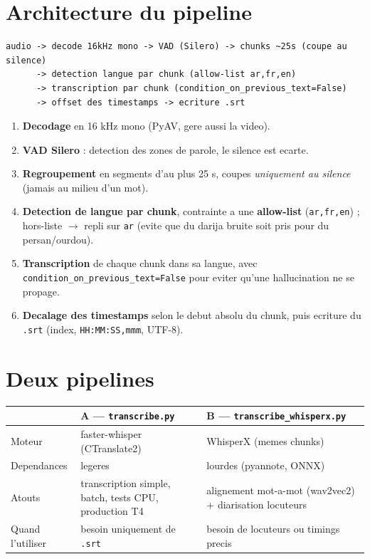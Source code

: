 \documentclass[11pt, a4paper]{article}
\begin{document}
\section{Architecture du pipeline}

\begin{lstlisting}
audio -> decode 16kHz mono -> VAD (Silero) -> chunks ~25s (coupe au silence)
      -> detection langue par chunk (allow-list ar,fr,en)
      -> transcription par chunk (condition_on_previous_text=False)
      -> offset des timestamps -> ecriture .srt
\end{lstlisting}

\begin{enumerate}
  \item \textbf{Decodage} en 16 kHz mono (PyAV, gere aussi la video).
  \item \textbf{VAD Silero} : detection des zones de parole, le silence est ecarte.
  \item \textbf{Regroupement} en segments d'au plus 25 s, coupes \emph{uniquement au silence} (jamais au milieu d'un mot).
  \item \textbf{Detection de langue par chunk}, contrainte a une \textbf{allow-list} (\texttt{ar,fr,en}) ; hors-liste $\rightarrow$ repli sur \texttt{ar} (evite que du darija bruite soit pris pour du persan/ourdou).
  \item \textbf{Transcription} de chaque chunk dans sa langue, avec \texttt{condition\_on\_previous\_text=False} pour eviter qu'une hallucination ne se propage.
  \item \textbf{Decalage des timestamps} selon le debut absolu du chunk, puis ecriture du \texttt{.srt} (index, \texttt{HH:MM:SS,mmm}, UTF-8).
\end{enumerate}

\section{Deux pipelines}

\begin{center}
\small
\begin{tabularx}{\linewidth}{lXX}
\toprule
 & \textbf{A — \texttt{transcribe.py}} & \textbf{B — \texttt{transcribe\_whisperx.py}} \\
\midrule
Moteur & faster-whisper (CTranslate2) & WhisperX (memes chunks) \\
Dependances & legeres & lourdes (pyannote, ONNX) \\
Atouts & transcription simple, batch, tests CPU, production T4 & alignement mot-a-mot (wav2vec2) + diarisation locuteurs \\
Quand l'utiliser & besoin uniquement de \texttt{.srt} & besoin de locuteurs ou timings precis \\
\bottomrule
\end{tabularx}
\end{center}
\end{document}
